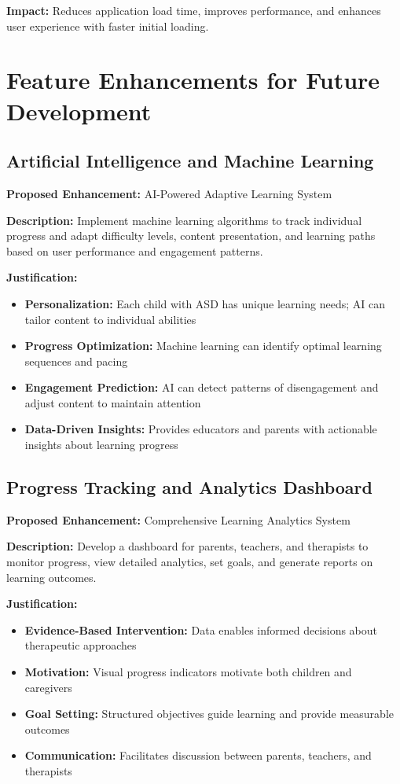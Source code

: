 \documentclass[12pt,a4paper]{article}
\begin{document}
\textbf{Impact:}
Reduces application load time, improves performance, and enhances user experience with faster initial loading.

\newpage
\section{Feature Enhancements for Future Development}

\subsection{Artificial Intelligence and Machine Learning}
\textbf{Proposed Enhancement:} AI-Powered Adaptive Learning System

\textbf{Description:}
Implement machine learning algorithms to track individual progress and adapt difficulty levels, content presentation, and learning paths based on user performance and engagement patterns.

\textbf{Justification:}
\begin{itemize}
    \item \textbf{Personalization:} Each child with ASD has unique learning needs; AI can tailor content to individual abilities
    \item \textbf{Progress Optimization:} Machine learning can identify optimal learning sequences and pacing
    \item \textbf{Engagement Prediction:} AI can detect patterns of disengagement and adjust content to maintain attention
    \item \textbf{Data-Driven Insights:} Provides educators and parents with actionable insights about learning progress
\end{itemize}

\subsection{Progress Tracking and Analytics Dashboard}
\textbf{Proposed Enhancement:} Comprehensive Learning Analytics System

\textbf{Description:}
Develop a dashboard for parents, teachers, and therapists to monitor progress, view detailed analytics, set goals, and generate reports on learning outcomes.

\textbf{Justification:}
\begin{itemize}
    \item \textbf{Evidence-Based Intervention:} Data enables informed decisions about therapeutic approaches
    \item \textbf{Motivation:} Visual progress indicators motivate both children and caregivers
    \item \textbf{Goal Setting:} Structured objectives guide learning and provide measurable outcomes
    \item \textbf{Communication:} Facilitates discussion between parents, teachers, and therapists
\end{itemize}
\end{document}
